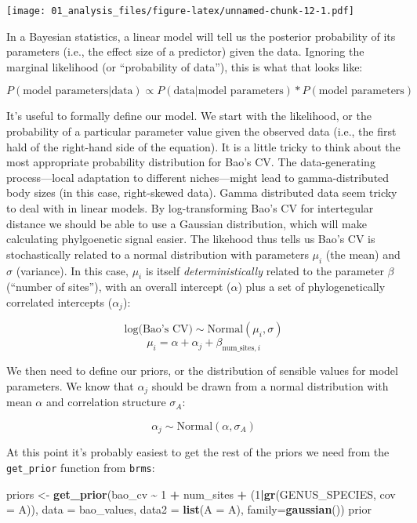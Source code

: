 \documentclass[
]{article}
\newenvironment{Shaded}{\begin{snugshade}}{\end{snugshade}}
\newcommand{\AttributeTok}[1]{\textcolor[rgb]{0.13,0.29,0.53}{#1}}
\newcommand{\DecValTok}[1]{\textcolor[rgb]{0.00,0.00,0.81}{#1}}
\newcommand{\FunctionTok}[1]{\textcolor[rgb]{0.13,0.29,0.53}{\textbf{#1}}}
\newcommand{\NormalTok}[1]{#1}
\newcommand{\OtherTok}[1]{\textcolor[rgb]{0.56,0.35,0.01}{#1}}
\newcommand{\SpecialCharTok}[1]{\textcolor[rgb]{0.81,0.36,0.00}{\textbf{#1}}}
\begin{document}
\texttt{[image: 01\_analysis\_files/figure-latex/unnamed-chunk-12-1.pdf]}

In a Bayesian statistics, a linear model will tell us the posterior
probability of its parameters (i.e., the effect size of a predictor)
given the data. Ignoring the marginal likelihood (or ``probability of
data''), this is what that looks like:

\[
P(\text{model parameters}|\text{data}) \propto P(\text{data}|\text{model parameters})*P(\text{model parameters})
\]

It's useful to formally define our model. We start with the likelihood,
or the probability of a particular parameter value given the observed
data (i.e., the first hald of the right-hand side of the equation). It
is a little tricky to think about the most appropriate probability
distribution for Bao's CV. The data-generating process---local
adaptation to different niches---might lead to gamma-distributed body
sizes (in this case, right-skewed data). Gamma distributed data seem
tricky to deal with in linear models. By log-transforming Bao's CV for
intertegular distance we should be able to use a Gaussian distribution,
which will make calculating phylgoenetic signal easier. The likehood
thus tells us Bao's CV is stochastically related to a normal
distribution with parameters \(\mu_i\) (the mean) and \(\sigma\)
(variance). In this case, \(\mu_i\) is itself \emph{deterministically}
related to the parameter \(\beta\) (``number of sites''), with an
overall intercept (\(\alpha\)) plus a set of phylogenetically correlated
intercepts (\(\alpha_j\)):

\[
\text{log(Bao's CV)} \sim \text{Normal}(\mu_i, \sigma)
\] \[
\mu_i = \alpha + \alpha_j + \beta_{\text{num_sites},i}
\]

We then need to define our priors, or the distribution of sensible
values for model parameters. We know that \(\alpha_j\) should be drawn
from a normal distribution with mean \(\alpha\) and correlation
structure \(\sigma_A\):

\[
\alpha_j \sim \text{Normal}(\alpha, \sigma_A)
\]

At this point it's probably easiest to get the rest of the priors we
need from the \texttt{get\_prior} function from \texttt{brms}:

\begin{Shaded}
\begin{Highlighting}[]
\NormalTok{priors }\OtherTok{\textless{}{-}} \FunctionTok{get\_prior}\NormalTok{(bao\_cv }\SpecialCharTok{\textasciitilde{}} \DecValTok{1} \SpecialCharTok{+}\NormalTok{ num\_sites }\SpecialCharTok{+}\NormalTok{ (}\DecValTok{1}\SpecialCharTok{|}\FunctionTok{gr}\NormalTok{(GENUS\_SPECIES, }\AttributeTok{cov =}\NormalTok{ A)),}
                    \AttributeTok{data =}\NormalTok{ bao\_values, }\AttributeTok{data2 =} \FunctionTok{list}\NormalTok{(}\AttributeTok{A =}\NormalTok{ A), }\AttributeTok{family=}\FunctionTok{gaussian}\NormalTok{())   }
\NormalTok{prior}
\end{Highlighting}
\end{Shaded}
\end{document}

